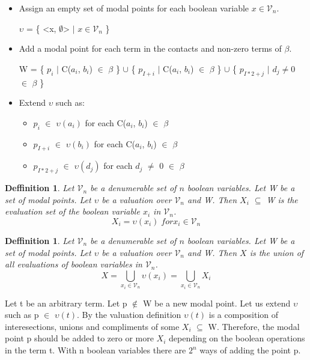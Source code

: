 \documentclass{article}
\newcommand\V{\mathcal{V}}
\newcommand\VXi{X_i}
\newcommand\VX{X}
\newtheorem{defn}[theorem]{Deffinition}
\begin{document}
		\begin{itemize}
			\item Assign an empty set of modal points for each boolean variable $x \in \V_n$.
	
			$\upsilon$ = \{ <x, $\emptyset$> $\mid$ $ x \in \V_n$ \}
			
			\item Add a modal point for each term in the contacts and non-zero terms of $\beta$. 
			
			W = \{ $p_i$ $\mid$ C($a_i$, $b_i$) $\in$ $\beta$ \} $\cup$ \{ $p_{I+i}$ $\mid$ C($a_i$, $b_i$) $\in$ $\beta$ \} $\cup$ \{ $p_{I*2+j}$ $\mid$ $d_j \neq 0$ $\in$ $\beta$ \}
						
			\item Extend $\upsilon$ such as:
			
			\begin{itemize}
				\item $p_i$ $\in$ $\upsilon(a_i)$ for each C($a_i$, $b_i$) $\in$ $\beta$ 
				\item $p_{I+i}$ $\in$ $\upsilon(b_i)$ for each C($a_i$, $b_i$) $\in$ $\beta$ 
				\item $p_{I*2+j}$ $\in$ $\upsilon(d_j)$ for each $d_j$  $\neq$ 0 $\in$ $\beta$ 
			\end{itemize}
		\end{itemize}
				
		\begin{defn}
			Let $\V_n$ be a denumerable set of $n$ boolean variables. Let W be a set of modal points. Let $\upsilon$ be a valuation over $\V_n$ and W. Then $\VXi$ $\subseteq$ W is the evaluation set of the boolean variable $x_i$ in $\V_n$.
			\begin{equation}
				\VXi = \upsilon(x_i) \;for x_i \in \V_n
			\end{equation}
		\end{defn}
		
		\begin{defn}
			Let $\V_n$ be a denumerable set of $n$ boolean variables. Let W be a set of modal points. Let $\upsilon$ be a valuation over $\V_n$ and W.
			Then $\VX$ is the union of all evaluations of boolean variables in $\V_n$.
			\begin{equation}
				\VX = \bigcup\limits_{x_i \in \V_n}\upsilon(x_i) = \bigcup\limits_{x_i \in \V_n}\VXi
			\end{equation}
		\end{defn}
		
		Let t be an arbitrary term. Let p $\notin$ W be a new modal point. Let us extend $\upsilon$ such as p $\in$ $\upsilon(t)$. By the valuation definition  $\upsilon(t)$ is a composition of interesections, unions and compliments of some $\VXi$ $\subseteq$ W. Therefore, the modal point p should be added to zero or more $\VXi$ depending on the boolean operations in the term t. With n boolean variables there are $2^n$ ways of adding the point p.
		
\end{document}
